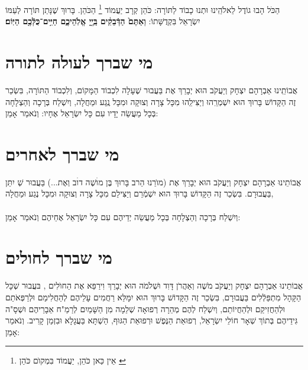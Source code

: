 \documentclass[a4paper, twoside, openany, parskip=half, 12pt]{article}
\begin{document}
 הַכֹּל הָבוּ גוֹדֶל לֵאלֹהֵֽינוּ וּתְנוּ כָבוֹד לַתּוֹרָה: כֹּהֵן קְרָב יַעֲמוֹד 
  \footnote{
  אֵין כַּאן כֹּהֵן, יַעֲמוֹד 
  בִּמְקוׂם כֹּהֵן
  \label{xx}} 
 הַכֹּהֵן. בָּרוּךְ שֶׁנָּתַן תּוֹרָה לְעַמּוֹ יִשְׂרָאֵל בִּקְדֻשָּׁתוֹ:
\textbf{וְאַתֶּם֙ הַדְּֿבֵקִ֔ים בַּֽיְ֖יָ אֱלֹֽהֵיכֶ֑ם חַיִּ֥ים־כֻּלְּֿכֶ֖ם הַיּֽוֹם׃} \\

\section*{מי שברך לעולה לתורה}
 אֲבוֹתֵֽינוּ אַבְרָהָם יִצְחָק וְיַעֲקֹב הוּא יְבָרֵךְ אֶת 
  בַּעֲבוּר שֶׁעָלָה לִכְבוֹד הַמָּקוֹם,  וְלִכְבוֹד הַתּוֹרָה, 
 בִּשְׂכַר זֶה הַקָּדוֹשׁ בָּרוּךְ הוּא יִשְׁמְרֵֽהוּ וְיַצִּילֵֽהוּ מִכָּל צָרָה וְצוּקָה
וּמִכָּל נֶֽגַע וּמַחֲלָה,
  וְיִשְׁלַח בְּרָכָה וְהַצְלָחָה בְּכָל מַעֲשֵׂה יָדָיו 
    עִם כָּל יִשְׂרָאֵל אֶחָיו: וְנֹאמַר אָמֵן:\\

\section*{מי שברך לאחרים}
 אֲבוֹתֵינוּ אַבְרָהָם יִצְחָק וְיַעֲקֹב הוּא יְבָרֵךְ אֶת (מוׂרֵנוּ הַרב בָּרוּךְ בֶּן מוׄשֶׁה דוׄב וְאֶת...) בַּעֲבוּר  שְׁ
  יִתֵּן 
   בַּעֲבוּרָם. בִּשְׂכַר זֶה הַקָּדוֹשׁ בָּרוּךְ הוּא יִשְׁמְֿרֵם וְיַצִּילֵם מִכָּל צָרָה וְצוּקָה וּמִכָּל נֶגַע וּמַחֲלָה,\\
  \\
  וְיִשְׁלַח בְּרָכָה וְהַצְלָחָה בְּכָל מַעֲשֵׂה יְדֵיהֶם עִם כָּל יִשְׂרָאֵל אֶחֵיהֶם וְנֹאמַר אָמֵן:\\

\section*{מי שברך לחולים}
 אֲבוֹתֵינוּ אַבְרָהָם יִצְחָק וְיַעֲקֹב מֹשֶׁה וְאַהֲרֹן דָּוִד וּשְׁלֹמֹה הוּא יְבָרֵךְ וִירַפֵּא אֶת הַחוׂלִים 
,
בּעֲבוּר שְׁכָּל הַקָּהָל מִתְפַּלְֿלִים בַּעֲבוּרָם,  בִּשְׂכַר זֶה
 הַקָּדוֹשׁ בָּרוּךְ הוּא יִמָּלֵּא רַחֲמִים עָלֵיהֶם לְהַחֲלִימַם וּלְרַפְּאֹתַם וּלְהַחֲזִיקַם וּלְהַחֲיוֹתַם, וְיִשְׁלַח לְהֶם מְהֵרָה רְפוּאָה שְׁלֵמָה מִן הַשָּׁמַיִם לְרַמַ"ח אֵבָרֵיהֶם וּשְׁסָ"ה גִּידֵיהֶם בְּתוֹךְ שְׁאָר חוֹלֵי יִשְׂרָאֵל, רְפוּאַת הַנֶּפֶשׁ וּרְפוּאַת הַגּוּף,
  הַשְׁתָּא בַּעֲגָלָא וּבִזְמַן קָרִיב. וְנֹאמַר אָמֵן:\\
\end{document}
